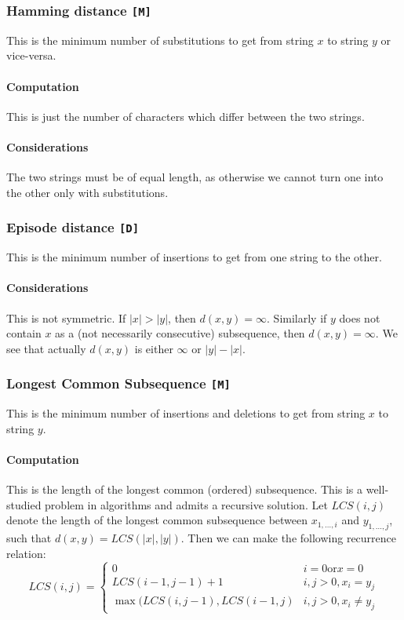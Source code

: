 \documentclass[12pt,a4paper]{article}
\newcommand{\1}[1]{\mathds{1}\left[#1\right]}
\begin{document}
\subsubsection{Hamming distance \texttt{[M]}}
This is the minimum number of substitutions to get from string $x$ to string $y$ or vice-versa.

\paragraph{Computation} This is just the number of characters which differ between the two strings.
\paragraph{Considerations} The two strings must be of equal length, as otherwise we cannot turn one into the other only with substitutions.

\subsubsection{Episode distance \texttt{[D]}}
This is the minimum number of insertions to get from one string to the other.

\paragraph{Considerations} This is not symmetric. If $|x|>|y|$, then $d(x,y)=\infty$. Similarly if $y$ does not contain $x$ as a (not necessarily consecutive) subsequence, then $d(x,y)=\infty$. We see that actually $d(x,y)$ is either $\infty$ or $|y|-|x|$.

\subsubsection{Longest Common Subsequence \texttt{[M]}}
This is the minimum number of insertions and deletions to get from string $x$ to string $y$.

\paragraph{Computation} This is the length of the longest common (ordered) subsequence. This is a well-studied problem in algorithms and admits a recursive solution. Let $LCS(i,j)$ denote the length of the longest common subsequence between $x_{1,\ldots,i}$ and $y_{1,\ldots, j}$, such that $d(x,y)=LCS(|x|,|y|)$. Then we can make the following recurrence relation: \cite{algos}
\[LCS(i,j)=\begin{cases}0 & i=0\text{or} x=0\\ LCS(i-1,j-1)+1 & i,j>0,x_i=y_j\\ \max(LCS(i,j-1),LCS(i-1,j)&i,j>0,x_i\neq y_j\end{cases}\]%
\end{document}
